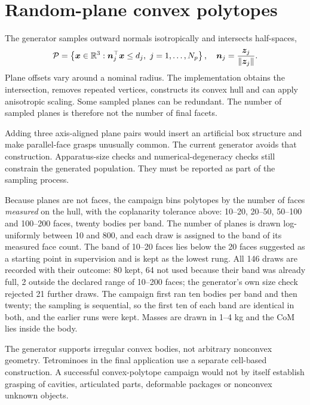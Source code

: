 
\section{Random-plane convex polytopes}

The generator samples outward normals isotropically and intersects half-spaces,
\begin{equation}
\mathcal P=\left\{\bm{x}\in\mathbb{R}^3:
\bm{n}_j^\top\bm{x}\leq d_j,\ j=1,\ldots,N_p\right\},
\quad
\bm{n}_j=\frac{\bm{z}_j}{\left\lVert\bm{z}_j\right\rVert}.
\label{eq:random-halfspaces}
\end{equation}
Plane offsets vary around a nominal radius. The implementation obtains the intersection, removes repeated vertices, constructs its convex hull and can apply anisotropic scaling. Some sampled planes can be redundant. The number of sampled planes is therefore not the number of final facets.

Adding three axis-aligned plane pairs would insert an artificial box structure and make parallel-face grasps unusually common. The current generator avoids that construction. Apparatus-size checks and numerical-degeneracy checks still constrain the generated population. They must be reported as part of the sampling process.

Because planes are not faces, the campaign bins polytopes by the number of faces \emph{measured} on the hull, with the coplanarity tolerance above: 10--20, 20--50, 50--100 and 100--200 faces, twenty bodies per band. The number of planes is drawn log-uniformly between 10 and 800, and each draw is assigned to the band of its measured face count. The band of 10--20 faces lies below the 20 faces suggested as a starting point in supervision and is kept as the lowest rung. All 146 draws are recorded with their outcome: 80 kept, 64 not used because their band was already full, 2 outside the declared range of 10--200 faces; the generator's own size check rejected 21 further draws. The campaign first ran ten bodies per band and then twenty; the sampling is sequential, so the first ten of each band are identical in both, and the earlier runs were kept. Masses are drawn in 1--4 kg and the CoM lies inside the body.

The generator supports irregular convex bodies, not arbitrary nonconvex geometry. Tetrominoes in the final application use a separate cell-based construction. A successful convex-polytope campaign would not by itself establish grasping of cavities, articulated parts, deformable packages or nonconvex unknown objects.

